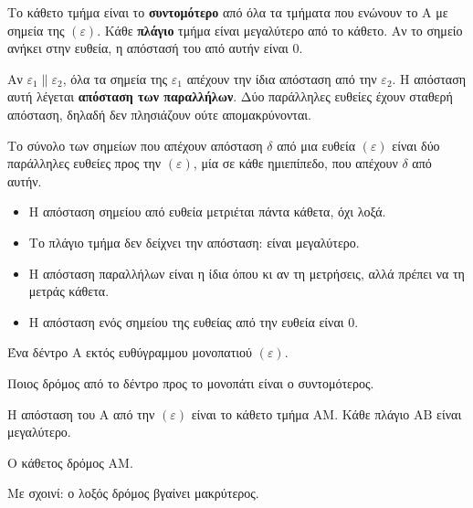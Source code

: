 Το κάθετο τμήμα είναι το \textbf{συντομότερο} από όλα τα τμήματα που ενώνουν το $\mathrm{Α}$ με σημεία της $(\varepsilon)$. Κάθε \textbf{πλάγιο} τμήμα είναι μεγαλύτερο από το κάθετο. Αν το σημείο ανήκει στην ευθεία, η απόστασή του από αυτήν είναι $0$.

\begin{center}
\end{center}


Αν $\varepsilon_1\parallel\varepsilon_2$, όλα τα σημεία της $\varepsilon_1$ απέχουν την ίδια απόσταση από την $\varepsilon_2$. Η απόσταση αυτή λέγεται \textbf{απόσταση των παραλλήλων}. Δύο παράλληλες ευθείες έχουν σταθερή απόσταση, δηλαδή δεν πλησιάζουν ούτε απομακρύνονται.

Το σύνολο των σημείων που απέχουν απόσταση $\delta$ από μια ευθεία $(\varepsilon)$ είναι δύο παράλληλες ευθείες προς την $(\varepsilon)$, μία σε κάθε ημιεπίπεδο, που απέχουν $\delta$ από αυτήν.

\begin{prosoxi}
\begin{itemize}[leftmargin=1.2em,itemsep=0.3ex,topsep=2pt]
\item Η απόσταση σημείου από ευθεία μετριέται πάντα κάθετα, όχι λοξά.
\item Το πλάγιο τμήμα δεν δείχνει την απόσταση: είναι μεγαλύτερο.
\item Η απόσταση παραλλήλων είναι η ίδια όπου κι αν τη μετρήσεις, αλλά πρέπει να τη μετράς κάθετα.
\item Η απόσταση ενός σημείου της ευθείας από την ευθεία είναι $0$.
\end{itemize}
\end{prosoxi}


\tixero Ένα δέντρο $\mathrm{Α}$ εκτός ευθύγραμμου μονοπατιού $(\varepsilon)$.\par
\tithelo Ποιος δρόμος από το δέντρο προς το μονοπάτι είναι ο συντομότερος.\par
\possindeo Η απόσταση του $\mathrm{Α}$ από την $(\varepsilon)$ είναι το κάθετο τμήμα $\mathrm{ΑΜ}$. Κάθε πλάγιο $\mathrm{ΑΒ}$ είναι μεγαλύτερο.\par
\apantisi Ο κάθετος δρόμος $\mathrm{ΑΜ}$.\par
\elegxos Με σχοινί: ο λοξός δρόμος βγαίνει μακρύτερος.

